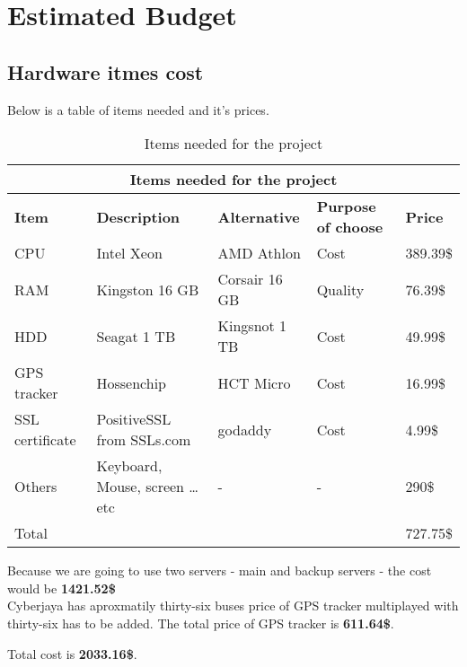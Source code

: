 \chapter{Estimated Budget} 

\label{Chapter2} 


\doublespacing

\section{Hardware itmes cost}
Below is a table of items needed and it's prices.

\begin{table}[ht]
	\begin{center}
		\begin{tabular}{ |p{1.5cm}|p{3cm}|p{3cm}|p{4cm}|p{1.5cm}| }
			\hline \multicolumn{5}{|c|}{\textbf{Items needed for the project}} \\ [1.0ex]
			\hline \textbf{Item} & \textbf{Description} & \textbf{Alternative} & 
			\textbf{Purpose of choose} & \textbf{Price} \\
			\hline CPU & Intel Xeon  & AMD Athlon
			 & Cost & 389.39\$  \\ 
			\hline RAM & Kingston 
			16 GB  &  Corsair
			16 GB  & Quality  & 76.39\$\\ 
			\hline HDD & Seagat 1 TB
			  & Kingsnot 1 TB & Cost  & 49.99\$  \\ 
			\hline GPS tracker & Hossenchip  & HCT Micro
			 & Cost  & 16.99\$  \\ 
			 \hline SSL certificate & PositiveSSL from SSLs.com & godaddy
			 & Cost  & 4.99\$  \\ 
			 
			\hline Others & Keyboard, Mouse, screen … etc     & - & - & 290\$ \\
			\hline  Total & & & &727.75\$ \\
			\hline
			
		\end{tabular}
		
		\caption{Items needed for the project}
		\label{table:Itmes-needed-for-project}
	\end{center}
\end{table}

Because we are going to use two servers - main and backup servers - the cost would be \textbf{1421.52\$}\\

Cyberjaya has aproxmatily thirty-six buses price of GPS tracker multiplayed with thirty-six has to be added. The total price of GPS tracker is \textbf{611.64\$}.


Total cost is \textbf{2033.16\$}.
